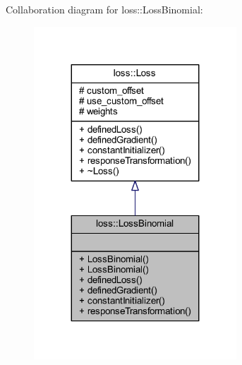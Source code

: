 Collaboration diagram for loss\+:\+:Loss\+Binomial\+:
\nopagebreak
\begin{figure}[H]
\begin{center}
\leavevmode
\includegraphics[width=215pt]{classloss_1_1_loss_binomial__coll__graph}
\end{center}
\end{figure}
